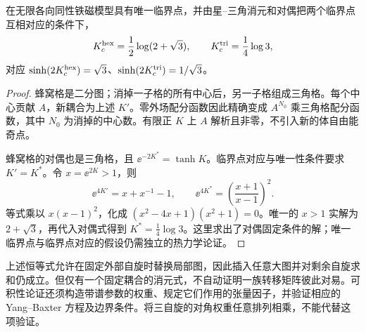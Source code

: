 \begin{proposition}[蜂窝格与三角格的候选临界耦合]
在无限各向同性铁磁模型具有唯一临界点，并由星--三角消元和对偶把两个临界点互相对应的条件下，
\[
 K_c^{\rm hex}=\frac12\log(2+\sqrt3),\qquad
 K_c^{\rm tri}=\frac14\log3,
\]
对应 $\sinh(2K_c^{\rm hex})=\sqrt3$、$\sinh(2K_c^{\rm tri})=1/\sqrt3$。
\end{proposition}
\begin{proof}
蜂窝格是二分图；消掉一子格的所有中心后，另一子格组成三角格。每个中心贡献 $A$，新耦合为上述 $K'$。零外场配分函数因此精确变成 $A^{N_0}$ 乘三角格配分函数，其中 $N_0$ 为消掉的中心数。有限正 $K$ 上 $A$ 解析且非零，不引入新的体自由能奇点。

蜂窝格的对偶也是三角格，且 $\ee^{-2K^*}=\tanh K$。临界点对应与唯一性条件要求 $K'=K^*$。令 $x=\ee^{2K}>1$，则
\[
 \ee^{4K'}=x+x^{-1}-1,\qquad \ee^{4K^*}=\left(\frac{x+1}{x-1}\right)^2.
\]
等式乘以 $x(x-1)^2$，化成 $(x^2-4x+1)(x^2+1)=0$。唯一的 $x>1$ 实解为 $2+\sqrt3$，再代入对偶式得到 $K^*=\tfrac14\log3$。这里求出了对偶固定条件的解；唯一临界点与临界点对应的假设仍需独立的热力学论证。
\end{proof}

\begin{note}
上述恒等式允许在固定外部自旋时替换局部图，因此插入任意大图并对剩余自旋求和仍成立。但仅有一个固定耦合的消元式，不自动证明一族转移矩阵彼此对易。可积性论证还须构造带谱参数的权重、规定它们作用的张量因子，并验证相应的 Yang--Baxter 方程及边界条件。将三自旋的对角权重任意排列相乘，不能代替这项验证。
\end{note}
